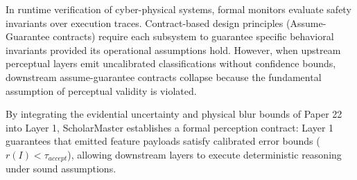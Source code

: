 \documentclass[conference]{IEEEtran}
\begin{document}
In runtime verification of cyber-physical systems, formal monitors evaluate safety invariants over execution traces. Contract-based design principles (Assume-Guarantee contracts) require each subsystem to guarantee specific behavioral invariants provided its operational assumptions hold. However, when upstream perceptual layers emit uncalibrated classifications without confidence bounds, downstream assume-guarantee contracts collapse because the fundamental assumption of perceptual validity is violated.

By integrating the evidential uncertainty and physical blur bounds of Paper 22 \cite{b14} into Layer 1, ScholarMaster establishes a formal perception contract: Layer 1 guarantees that emitted feature payloads satisfy calibrated error bounds ($r(I) < \tau_{accept}$), allowing downstream layers to execute deterministic reasoning under sound assumptions.

\begin{table}[htbp]
\caption{Comparative Taxonomy of Multi-Layer Pipeline Failure Containment Paradigms}
\centering
{}
\label{tab:p25_taxonomy}
\end{table}
\end{document}

